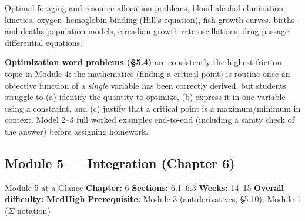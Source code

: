 \documentclass[11pt]{article}
\newcommand{\diffM}{\textcolor{diffamberc}{\textbf{Med}}}
\newcommand{\diffH}{\textcolor{diffredc}{\textbf{High}}}
\begin{document}
\begin{appbox}
Optimal foraging and resource-allocation problems, blood-alcohol elimination kinetics,
oxygen--hemoglobin binding (Hill's equation), fish growth curves, births-and-deaths
population models, circadian growth-rate oscillations, drug-passage differential equations.
\end{appbox}

\begin{diffbox}
\textbf{Optimization word problems (\S5.4)} are consistently the highest-friction topic in
Module 4: the mathematics (finding a critical point) is routine once an objective function
of a \emph{single} variable has been correctly derived, but students struggle to (a)
identify the quantity to optimize, (b) express it in one variable using a constraint, and
(c) justify that a critical point is a maximum/minimum in context. Model 2--3 full
worked examples end-to-end (including a sanity check of the answer) before assigning
homework.
\end{diffbox}

\subsection*{Module 5 --- Integration (Chapter 6)}

\begin{modulebox}{Module 5 at a Glance}{}
\textbf{Chapter:} 6 \quad\textbf{Sections:} 6.1--6.3 \quad\textbf{Weeks:} 14--15 \quad
\textbf{Overall difficulty:} \diffM\text{--}\diffH \quad
\textbf{Prerequisite:} Module 3 (antiderivatives, \S5.10); Module 1 ($\Sigma$-notation)
\end{modulebox}
\end{document}
